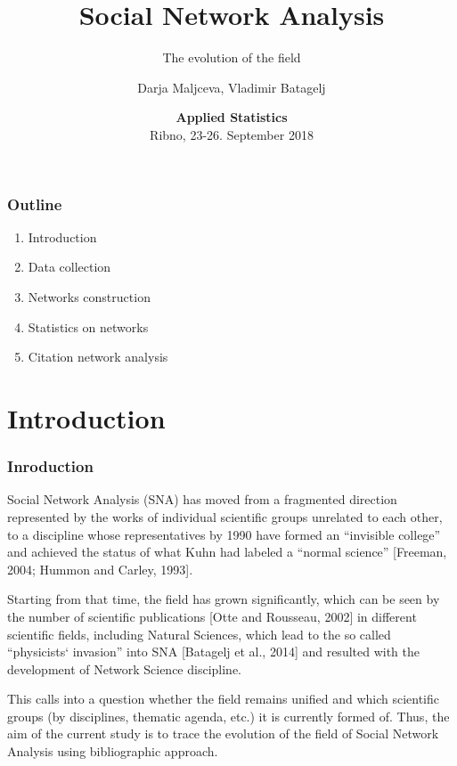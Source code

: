 \documentclass[hyperref={pdfstartview={FitBH -32768},
                         pdfpagemode=FullScreen,
                         plainpages=false,
                         colorlinks=true}
              ]{beamer}
\title[SNA. Evolution of the field]{\textbf{Social Network Analysis}}\subtitle{The evolution of the field}
\author[D. Maltseva, V. Batagelj]{Darja Maljceva, Vladimir Batagelj}
\institute[IMFM \& IAM UP]{IMFM Ljubljana, IAM UP Koper and NRU HSE Moscow }
\date[September 23-26, 2018]{\small
\textcolor{BrickRed}{\textbf{Applied Statistics}} \\
Ribno, 23-26. September 2018}
\newcommand{\clock}{\count254=\time \divide\count254 by 60
 \count255=\count254 \multiply\count255 by -60
 \advance\count255 by \time
 \ifnum\count254<10 0\fi\number\count254\,:\,%
 \ifnum\count255<10 0\fi\number\count255}
\begin{document}

\frame{\maketitle}

\begin{frame}
\frametitle{Outline}
\small
\begin{enumerate}
\item Introduction 
\item Data collection 
\item Networks construction 
\item Statistics on networks
\item Citation network analysis
\end{enumerate}




\end{frame}

\section{Introduction}

\begin{frame}[fragile]
\frametitle{Inroduction}
\small

Social Network Analysis (SNA) has moved from a fragmented direction represented by the works of individual scientific groups unrelated to each other, to a discipline whose representatives by 1990 have formed an “invisible college” and achieved the status of  what Kuhn had labeled a “normal science” [Freeman, 2004; Hummon and Carley, 1993]. \medskip

Starting from that time, the field has grown significantly, which can be seen by the number of scientific publications [Otte and Rousseau, 2002] in different scientific fields, including Natural Sciences, which lead to the so called “physicists` invasion” into SNA [Batagelj et al., 2014] and resulted with the development of Network Science discipline. \medskip

This calls into a question whether the field remains unified and which scientific groups (by disciplines, thematic agenda, etc.) it is currently formed of. Thus, the aim of the current study is to trace the evolution of the field of Social Network Analysis using bibliographic approach.  \medskip 

\end{frame}
\end{document}
